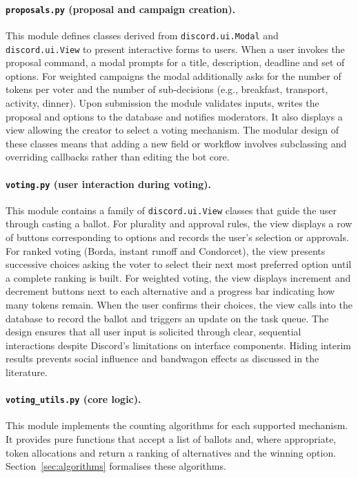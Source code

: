 \paragraph{\texttt{proposals.py} (proposal and campaign creation).}
This module defines classes derived from \texttt{discord.ui.Modal} and
\texttt{discord.ui.View} to present interactive forms to users.  When a
user invokes the proposal command, a modal prompts for a title,
description, deadline and set of options.  For weighted campaigns the
modal additionally asks for the number of tokens per voter and the
number of sub‑decisions (e.g., breakfast, transport, activity, dinner).
Upon submission the module validates inputs, writes the proposal and
options to the database and notifies moderators.  It also displays a
view allowing the creator to select a voting mechanism.  The modular
design of these classes means that adding a new field or workflow
involves subclassing and overriding callbacks rather than editing the
bot core.

\paragraph{\texttt{voting.py} (user interaction during voting).}
This module contains a family of \texttt{discord.ui.View} classes that
guide the user through casting a ballot.  For plurality and approval
rules, the view displays a row of buttons corresponding to options and
records the user’s selection or approvals.  For ranked voting
(Borda, instant runoff and Condorcet), the view presents successive
choices asking the voter to select their next most preferred option
until a complete ranking is built.  For weighted voting, the view
displays increment and decrement buttons next to each alternative and a
progress bar indicating how many tokens remain.  When the user
confirms their choices, the view calls into the database to record the
ballot and triggers an update on the task queue.  The design ensures
that all user input is solicited through clear, sequential interactions
despite Discord’s limitations on interface components.  Hiding interim
results prevents social influence and bandwagon effects as discussed in
the literature.

\paragraph{\texttt{voting\_utils.py} (core logic).}
This module implements the counting algorithms for each supported
mechanism.  It provides pure functions that accept a list of ballots
and, where appropriate, token allocations and return a ranking of
alternatives and the winning option.  Section~\ref{sec:algorithms}
formalises these algorithms.

